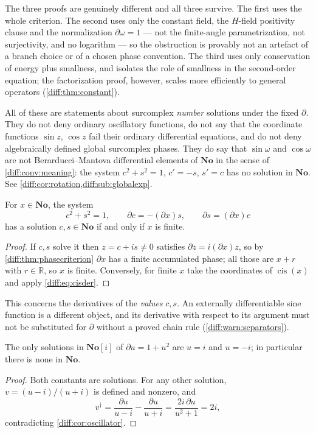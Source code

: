 \documentclass[11pt,letterpaper]{article}
\numberwithin{equation}{section}
\theoremstyle{definition}
\theoremstyle{remark}
\newcommand{\No}{\mathbf{No}}
\newcommand{\SC}{\mathbf{No}[i]}
\newcommand{\R}{\mathbb R}
\newcommand{\der}{\partial}
\newcommand{\cis}{\operatorname{cis}}
\begin{document}
The three proofs are genuinely different and all three survive. The first uses
the whole criterion. The second uses only the constant field, the $H$-field
positivity clause and the normalization $\der\omega=1$ --- not the finite-angle
parametrization, not surjectivity, and no logarithm --- so the obstruction is
provably not an artefact of a branch choice or of a chosen phase convention.
The third uses only conservation of energy plus smallness, and isolates the
role of smallness in the second-order equation; the factorization proof,
however, scales more efficiently to general operators
(\cref{diff:thm:constant}).

\begin{warning}
\label{diff:warn:whatnonexistence}
All of these are statements about surcomplex \emph{number} solutions under the
fixed $\der$. They do not deny ordinary oscillatory functions, do not say that
the coordinate functions $\sin z$, $\cos z$ fail their ordinary differential
equations, and do not deny algebraically defined global surcomplex phases. They
do say that $\sin\omega$ and $\cos\omega$ are not Berarducci--Mantova
differential elements of $\No$ in the sense of
\cref{diff:conv:meaning}: the system $c^{2}+s^{2}=1$, $c'=-s$, $s'=c$ has no
solution in $\No$. See \cref{diff:cor:rotation,diff:sub:globalexp}.
\end{warning}

\begin{corollary}
\label{diff:cor:rotation}
For $x\in\No$, the system
\[
 c^{2}+s^{2}=1,\qquad \der c=-(\der x)s,\qquad \der s=(\der x)c
\]
has a solution $c,s\in\No$ if and only if $x$ is finite.
\end{corollary}
\begin{proof}
If $c,s$ solve it then $z=c+is\neq0$ satisfies $\der z=i(\der x)z$, so by
\cref{diff:thm:phasecriterion} $\der x$ has a finite accumulated phase; all
those are $x+r$ with $r\in\R$, so $x$ is finite. Conversely, for finite $x$
take the coordinates of $\cis(x)$ and apply \cref{diff:eq:cisder}.
\end{proof}

This concerns the derivatives of the \emph{values} $c,s$. An externally
differentiable sine function is a different object, and its derivative with
respect to its argument must not be substituted for $\der$ without a proved
chain rule (\cref{diff:warn:separators}).

\begin{corollary}
\label{diff:cor:riccati}
The only solutions in $\SC$ of $\der u=1+u^{2}$ are $u=i$ and $u=-i$; in
particular there is none in $\No$.
\end{corollary}
\begin{proof}
Both constants are solutions. For any other solution, $v=(u-i)/(u+i)$ is
defined and nonzero, and
\[
 v^{\dagger}=\frac{\der u}{u-i}-\frac{\der u}{u+i}
 =\frac{2i\,\der u}{u^{2}+1}=2i,
\]
contradicting \cref{diff:cor:oscillator}.
\end{proof}
\end{document}
